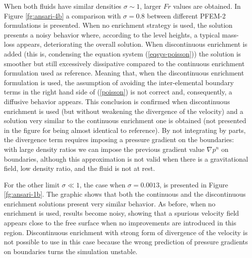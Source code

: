 When both fluids have similar densities $\sigma \sim 1$, larger $Fr$ values are obtained. In Figure \ref{fg:ansari-4b} a comparison with $\sigma=0.8$ between different PFEM-2 formulations is presented. When no enrichment strategy is used, the solution
presents a noisy behavior where, according to the level heights, a typical mass-loss appears, deteriorating the overall solution. When discontinuous enrichment is added (this is, condensing the equation system (\ref{eqsys-poisson})) the solution is smoother but still excessively dissipative compared to the continuous enrichment formulation used as reference. Meaning that, when the discontinuous enrichment formulation is used, the assumption of avoiding the inter-elemental boundary terms in the right hand side of (\ref{poisson}) is not correct and, consequently, a diffusive behavior appears. This conclusion is confirmed when discontinuous enrichment is used (but without weakening the divergence of the velocity) and a solution very similar to the continuous enrichment one is obtained (not presented in the figure for being almost identical to reference). By not integrating by parts, the divergence term requires imposing a pressure gradient on the boundaries: with large density ratios we can impose the previous gradient value $\nabla p^n$ on boundaries, although this approximation is not valid when there is a gravitational field, low density ratio, and the fluid is not at rest.

For the other limit $\sigma \ll 1$, the case when $\sigma=0.0013$, is presented in Figure \ref{fg:ansari-1b}. The graphic shows that both the continuous and the discontinuous enrichment solutions present very similar behavior. As before, when no enrichment is used, results become noisy, showing that a spurious velocity field appears close to the free surface when no improvements are introduced in this region. Discontinuous enrichment with strong form of divergence of the velocity is not possible to use in this case because the wrong prediction of pressure gradients on boundaries turns the simulation unstable.

